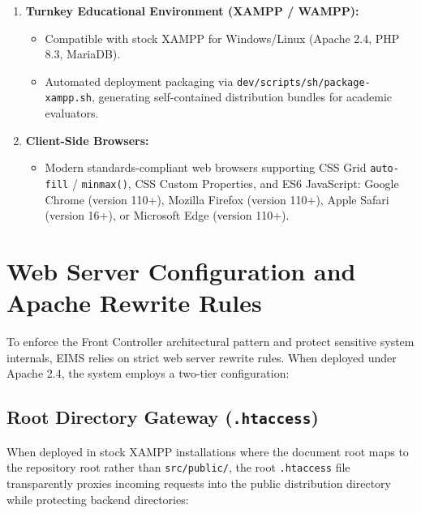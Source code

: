 \begin{enumerate}[label=\textbf{SE\arabic*.}]
\begin{itemize}
        \begin{itemize}
            \item \texttt{eims\_web}: Nginx 1.25-alpine reverse proxy and static asset file server.
            \item \texttt{eims\_app}: Dedicated PHP 8.3 FPM micro-container with volume-mounted application sources.
            \item \texttt{eims\_db}: Containerized MySQL 8.0 server with persistent data volumes.
        \end{itemize}
    \end{itemize}
    \item \textbf{Turnkey Educational Environment (XAMPP / WAMPP):}
    \begin{itemize}
        \item Compatible with stock XAMPP for Windows/Linux (Apache 2.4, PHP 8.3, MariaDB).
        \item Automated deployment packaging via \texttt{dev/scripts/sh/package-xampp.sh}, generating self-contained distribution bundles for academic evaluators.
    \end{itemize}
    \item \textbf{Client-Side Browsers:}
    \begin{itemize}
        \item Modern standards-compliant web browsers supporting CSS Grid \texttt{auto-fill} / \texttt{minmax()}, CSS Custom Properties, and ES6 JavaScript: Google Chrome (version 110+), Mozilla Firefox (version 110+), Apple Safari (version 16+), or Microsoft Edge (version 110+).
    \end{itemize}
\end{enumerate}

\section{Web Server Configuration and Apache Rewrite Rules}
\label{sec:req_rewrite}
To enforce the Front Controller architectural pattern and protect sensitive system internals, EIMS relies on strict web server rewrite rules. When deployed under Apache 2.4, the system employs a two-tier configuration:

\subsection{Root Directory Gateway (\texorpdfstring{\texttt{.htaccess}}{.htaccess})}
When deployed in stock XAMPP installations where the document root maps to the repository root rather than \texttt{src/public/}, the root \texttt{.htaccess} file transparently proxies incoming requests into the public distribution directory while protecting backend directories:


